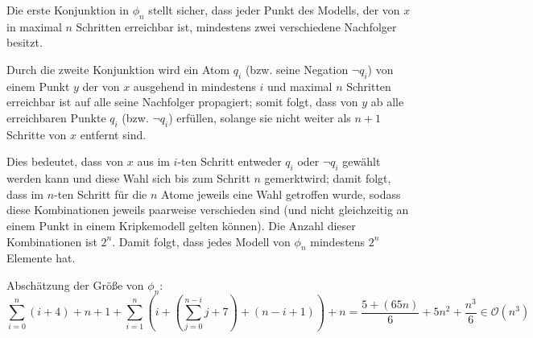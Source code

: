 Die erste Konjunktion in $\phi_n$ stellt sicher, dass jeder Punkt des
Modells, der von $x$ in maximal $n$ Schritten erreichbar ist, mindestens zwei
verschiedene Nachfolger besitzt.

Durch die zweite Konjunktion wird ein Atom $q_i$ (bzw. seine Negation $\neg q_i$)
von einem Punkt $y$ der von $x$ ausgehend in mindestens $i$ und maximal $n$
Schritten erreichbar ist auf alle seine Nachfolger propagiert; somit folgt,
dass von $y$ ab alle erreichbaren Punkte $q_i$ (bzw. $\neg q_i$) erfüllen,
solange sie nicht weiter als $n+1$ Schritte von $x$ entfernt sind.

Dies bedeutet, dass von $x$ aus im $i$-ten Schritt entweder $q_i$ oder $\neg
q_i$ gewählt werden kann und diese Wahl sich bis zum Schritt $n$ \glqq
gemerkt\grqq wird; damit folgt, dass im $n$-ten Schritt für die $n$ Atome
jeweils eine Wahl getroffen wurde, sodass diese Kombinationen jeweils paarweise
verschieden sind (und nicht gleichzeitig an einem Punkt in einem Kripkemodell
gelten können). Die Anzahl dieser Kombinationen ist $2^n$. Damit folgt, dass
jedes Modell von $\phi_n$ mindestens $2^n$ Elemente hat.

Abschätzung der Größe von $\phi_n$:
\[
\sum_{i=0}^{n}(i + 4) + n + 1 + \sum_{i=1}^{n}\left(i + \left(\sum_{j=0}^{n-i}
j + 7\right) + (n - i + 1) \right) + n = \frac{5+(65 n)}{6}+5 n^2+\frac{n^3}{6}
\in \mathcal{O}(n^3)
\]

